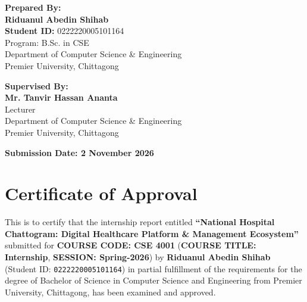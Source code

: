 \documentclass[11pt,a4paper,oneside]{report}
\begin{document}
\begin{titlepage}
    \begin{minipage}[t]{0.48\textwidth}
        \textbf{\large Prepared By:}\\[0.25cm]
        {\large \textbf{Riduanul Abedin Shihab}}\\[0.15cm]
        \textbf{Student ID:} 0222220005101164\\[0.12cm]
        Program: B.Sc. in CSE\\[0.12cm]
        Department of Computer Science \& Engineering\\[0.12cm]
        Premier University, Chittagong
    \end{minipage}
    \hfill
    \begin{minipage}[t]{0.48\textwidth}
        \begin{flushright}
            \textbf{\large Supervised By:}\\[0.25cm]
            {\large \textbf{Mr. Tanvir Hassan Ananta}}\\[0.15cm]
            Lecturer\\[0.12cm]
            Department of Computer Science \& Engineering\\[0.12cm]
            Premier University, Chittagong
        \end{flushright}
    \end{minipage}
    
    \vfill
    
    {\large \textbf{Submission Date: 2 November 2026}}
\end{titlepage}


\chapter*{Certificate of Approval}
This is to certify that the internship report entitled \textbf{``National Hospital Chattogram: Digital Healthcare Platform \& Management Ecosystem''} submitted for \textbf{COURSE CODE: CSE 4001} (\textbf{COURSE TITLE: Internship}, \textbf{SESSION: Spring-2026}) by \textbf{Riduanul Abedin Shihab} (Student ID: \texttt{0222220005101164}) in partial fulfillment of the requirements for the degree of Bachelor of Science in Computer Science and Engineering from Premier University, Chittagong, has been examined and approved.
\end{document}
